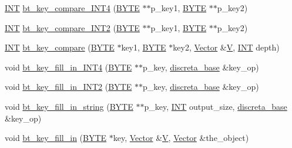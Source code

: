 \begin{DoxyCompactItemize}
\item 
\mbox{\hyperlink{galois_8h_a09fddde158a3a20bd2dcadb609de11dc}{I\+NT}} \mbox{\hyperlink{bt__key_8_c_afb03cce1de9c23799b1a852a8d66ae10}{bt\+\_\+key\+\_\+compare\+\_\+\+I\+N\+T4}} (\mbox{\hyperlink{galois_8h_ab6cc7b4aeb6ea31aba2b3fbfc83ff5e6}{B\+Y\+TE}} $\ast$$\ast$p\+\_\+key1, \mbox{\hyperlink{galois_8h_ab6cc7b4aeb6ea31aba2b3fbfc83ff5e6}{B\+Y\+TE}} $\ast$$\ast$p\+\_\+key2)
\item 
\mbox{\hyperlink{galois_8h_a09fddde158a3a20bd2dcadb609de11dc}{I\+NT}} \mbox{\hyperlink{bt__key_8_c_ae148d38635bac4df6bca63352d77203e}{bt\+\_\+key\+\_\+compare\+\_\+\+I\+N\+T2}} (\mbox{\hyperlink{galois_8h_ab6cc7b4aeb6ea31aba2b3fbfc83ff5e6}{B\+Y\+TE}} $\ast$$\ast$p\+\_\+key1, \mbox{\hyperlink{galois_8h_ab6cc7b4aeb6ea31aba2b3fbfc83ff5e6}{B\+Y\+TE}} $\ast$$\ast$p\+\_\+key2)
\item 
\mbox{\hyperlink{galois_8h_a09fddde158a3a20bd2dcadb609de11dc}{I\+NT}} \mbox{\hyperlink{bt__key_8_c_a44a07272f92f603a9401e4393205a37e}{bt\+\_\+key\+\_\+compare}} (\mbox{\hyperlink{galois_8h_ab6cc7b4aeb6ea31aba2b3fbfc83ff5e6}{B\+Y\+TE}} $\ast$key1, \mbox{\hyperlink{galois_8h_ab6cc7b4aeb6ea31aba2b3fbfc83ff5e6}{B\+Y\+TE}} $\ast$key2, \mbox{\hyperlink{class_vector}{Vector}} \&\mbox{\hyperlink{srg_8_c_af40a326b23c68a27cebe60f16634a2cb}{V}}, \mbox{\hyperlink{galois_8h_a09fddde158a3a20bd2dcadb609de11dc}{I\+NT}} depth)
\item 
void \mbox{\hyperlink{bt__key_8_c_ab9236cc7f045b1beefa9445abd170dff}{bt\+\_\+key\+\_\+fill\+\_\+in\+\_\+\+I\+N\+T4}} (\mbox{\hyperlink{galois_8h_ab6cc7b4aeb6ea31aba2b3fbfc83ff5e6}{B\+Y\+TE}} $\ast$$\ast$p\+\_\+key, \mbox{\hyperlink{classdiscreta__base}{discreta\+\_\+base}} \&key\+\_\+op)
\item 
void \mbox{\hyperlink{bt__key_8_c_ac206f8eb9650950295e887c1982713b2}{bt\+\_\+key\+\_\+fill\+\_\+in\+\_\+\+I\+N\+T2}} (\mbox{\hyperlink{galois_8h_ab6cc7b4aeb6ea31aba2b3fbfc83ff5e6}{B\+Y\+TE}} $\ast$$\ast$p\+\_\+key, \mbox{\hyperlink{classdiscreta__base}{discreta\+\_\+base}} \&key\+\_\+op)
\item 
void \mbox{\hyperlink{bt__key_8_c_a5a2f4bfd5849957123cdbcc914e9c65b}{bt\+\_\+key\+\_\+fill\+\_\+in\+\_\+string}} (\mbox{\hyperlink{galois_8h_ab6cc7b4aeb6ea31aba2b3fbfc83ff5e6}{B\+Y\+TE}} $\ast$$\ast$p\+\_\+key, \mbox{\hyperlink{galois_8h_a09fddde158a3a20bd2dcadb609de11dc}{I\+NT}} output\+\_\+size, \mbox{\hyperlink{classdiscreta__base}{discreta\+\_\+base}} \&key\+\_\+op)
\item 
void \mbox{\hyperlink{bt__key_8_c_a91e1d83fec4c2a6d4e45b96919377e91}{bt\+\_\+key\+\_\+fill\+\_\+in}} (\mbox{\hyperlink{galois_8h_ab6cc7b4aeb6ea31aba2b3fbfc83ff5e6}{B\+Y\+TE}} $\ast$key, \mbox{\hyperlink{class_vector}{Vector}} \&\mbox{\hyperlink{srg_8_c_af40a326b23c68a27cebe60f16634a2cb}{V}}, \mbox{\hyperlink{class_vector}{Vector}} \&the\+\_\+object)
$$
\end{DoxyCompactItemize}
